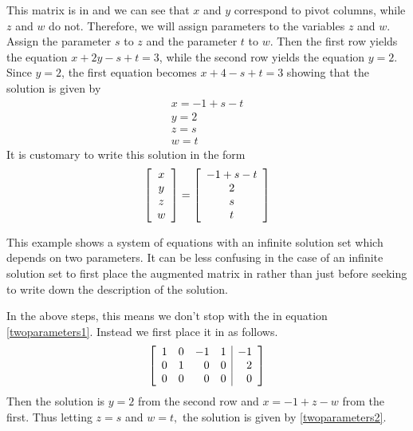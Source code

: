 \begin{solution}
This matrix is in \ef \;and we can see that $x$ and $y$ 
correspond to pivot columns, while $z$ and $w$ do not. Therefore, we will assign parameters to the variables $z$ and $w$.
Assign the parameter $s$ to $z$ and the parameter 
$t$ to $w.$ Then the first row yields the equation $x+2y-s+t=3$, while the second row yields the 
equation $y=2$. Since $y=2$, the first equation becomes  $x+4-s+t=3$
showing that the solution is given by
\begin{equation*}
\begin{array}{c}
x=-1+s-t \\
y=2 \\
z=s \\
w=t
\end{array}
\end{equation*}
It is customary to write this solution in
the form
\begin{equation}
\left[
\begin{array}{c}
x \\
y \\
z \\
w
\end{array}
\right] =\left[
\begin{array}{c}
-1+s-t \\
2 \\
s \\
t
\end{array}
\right]   \label{twoparameters2}
\end{equation}

\end{solution}

This example shows a system of equations with an infinite solution set which depends on two parameters. 
It can be less confusing in the case of an infinite solution set to first
place the augmented matrix in \rref \;rather than just
\ef \;before seeking to write down the description of the solution.

In the above steps, this means we don't stop with the \ef \;in equation \ref{twoparameters1}.
Instead we first place it in \rref \;as follows.
\begin{equation*}
\left[
\begin{array}{rrrr|r}
1 & 0 & -1 & 1 & -1 \\
0 & 1 & 0 & 0 & 2 \\
0 & 0 & 0 & 0 & 0
\end{array}
\right] 
\end{equation*}
Then the solution is $y=2$ from the second row and $x=-1+z-w$ from the
first. Thus letting $z=s$ and $w=t,$ the solution is given by \ref{twoparameters2}. 


